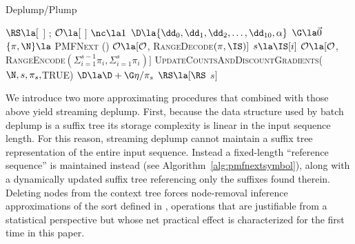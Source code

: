 \begin{algorithm}[t!]
    \caption{Deplump/Plump} \label{alg:deplump/plump}
    \begin{algorithmic}[1]
		\State $\RS \la [$ $]$ ;  $\mathcal{O} \la  [$ $]$%
		\State $\nc \la 1$ 
		\State $\D \la  \{ \dd_0, \dd_1, \dd_2, \dots, \dd_{10}, \alpha \}$ 
			\State $\G \la \vec 0$ 
			\State $ \{ \pi, \N  \} \la$  \textsc{PMFNext} (\RS)
				\State $\mathcal{O} \la [\mathcal{O}$,  \textsc{RangeDecode}$(\pi, \IS)]$
			\Else
				\State $s \la \IS[i]$
				\State $\mathcal{O}\la [\mathcal{O}$,   \textsc{RangeEncode}$(\Sigma_{i = 1}^{s-1} \pi_i, \Sigma_{i = 1}^{s} \pi_i)]$		
			\EndIf
			\State \textsc{UpdateCountsAndDiscountGradients}($\N,s,\pi_s,$TRUE)
			\State $\D \la \D + \G \eta / \pi_s$ 
			\State $\RS \la [\RS$ $s]$ 
		\EndFor
	\EndProcedure
	\end{algorithmic}
\end{algorithm}

We introduce two more approximating procedures that combined with those above yield streaming deplump.  First, because the data structure used by batch deplump is a suffix tree its storage complexity is linear in the input sequence length.  For this reason, streaming deplump cannot maintain a suffix tree representation of the entire input sequence.  Instead a fixed-length ``reference sequence''  is maintained instead (see Algorithm~\ref{alg:pmfnextsymbol}), along with a dynamically updated suffix tree referencing only the suffixes found therein.  Deleting nodes from the context tree forces node-removal inference approximations of the sort defined in \citep{Bartlett2010}, operations that are justifiable from a statistical perspective but whose net practical effect is characterized for the first time in this paper. %

